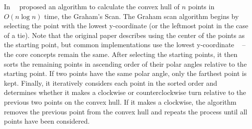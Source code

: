 In~\citeyear{graham_efficient_1972}~\cite{graham_efficient_1972} proposed an algorithm to calculate
the convex hull of $n$ points in $O(n \log n)$ time, the Graham's Scan.
The Graham scan algorithm begins by selecting the point with the lowest y-coordinate (or the leftmost point in the case of a tie).
Note that the original paper describes using the center of the points as the starting point,
but common implementations use the lowest y-coordinate
~\multiplefootnoteseparator{} --
the core concepts remain the same.
After selecting the starting points, it then sorts the remaining points in ascending order
of their polar angles relative to the starting point.
If two points have the same polar angle, only the farthest point is kept.
Finally, it iteratively considers each point in the sorted order and determines whether it
makes a clockwise or counterclockwise turn relative to the previous two points on the convex hull.
If it makes a clockwise, the algorithm removes the previous point from the convex hull
and repeats the process until all points have been considered.


